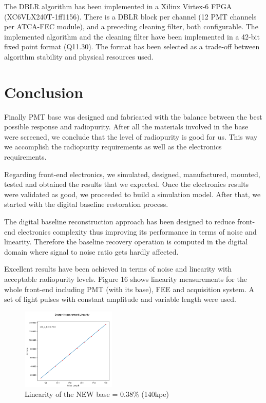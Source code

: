 \documentclass[a4paper, 10pt, oneside, twocolumn, 3p]{elsarticle}
\begin{document}
\par The DBLR algorithm has been implemented in a Xilinx Virtex-6 FPGA (XC6VLX240T-1ff1156). There is a DBLR block per channel (12 PMT channels per ATCA-FEC module), and a preceding cleaning filter, both configurable. The implemented algorithm and the cleaning filter have been implemented in a 42-bit fixed point format (Q11.30). The format has been selected as a trade-off between algorithm stability and physical resources used.


\section{Conclusion}

\par Finally PMT base was designed and fabricated with the balance between the best possible response and radiopurity. After all the materials involved in the base were screened, we conclude that the level of radiopurity is good for us.  This way we accomplish the radiopurity requirements as well as the electronics requirements.

\par Regarding front-end electronics, we simulated, designed, manufactured, mounted, tested and obtained the results that we expected. Once the electronics results were validated as good, we proceeded to build a simulation model. After that, we started with the digital baseline restoration process.

\par The digital baseline reconstruction approach has been designed to reduce front-end electronics complexity thus improving its performance in terms of noise and linearity. Therefore the baseline recovery operation is computed in the digital domain where signal to noise ratio gets hardly affected.

\par Excellent results have been achieved in terms of noise and linearity with acceptable radiopurity levels. Figure 16 shows linearity measurements for the whole front-end including PMT (with its base), FEE and acquisition system. A set of light pulses with constant amplitude and variable length were used.  

\begin{figure}[H]
	\begin{center}
		\includegraphics[width=0.4\textwidth]{./figures/7C_lin}
		\caption{Linearity of the NEW base = $0.38\%$ (140kpe)}
		\label{fig:linearity}
	\end{center}
\end{figure}
\end{document}
